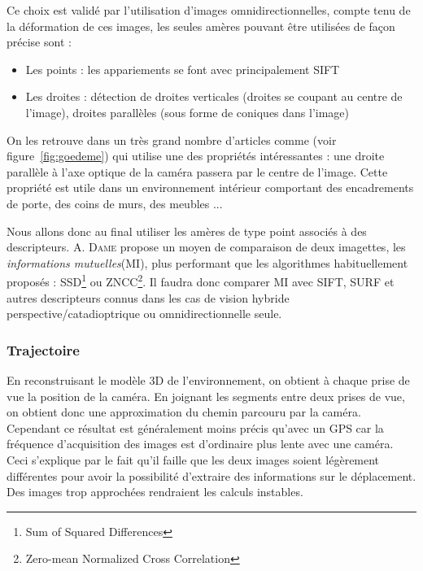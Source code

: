Ce choix est validé par l'utilisation d'images omnidirectionnelles, compte tenu de la déformation de ces images, les seules amères pouvant être utilisées de façon précise sont :
\begin{itemize}
\item Les points : les appariements se font avec principalement SIFT
\item Les droites : détection de droites verticales (droites se coupant au centre de l'image), droites parallèles (sous forme de coniques dans l'image)
\end{itemize}
On les retrouve dans un très grand nombre d'articles comme \cite{Goedeme07} (voir figure~\ref{fig:goedeme}) qui utilise une des propriétés intéressantes : une droite parallèle à l'axe optique de la caméra passera par le centre de l'image.
Cette propriété est utile dans un environnement intérieur comportant des encadrements de porte, des coins de murs, des meubles ...

Nous allons donc au final utiliser les amères de type point associés à des descripteurs.
A. \textsc{Dame} \cite{Dame10PhD} propose un moyen de comparaison de deux imagettes, les \emph{informations mutuelles}(MI), plus performant que les algorithmes habituellement proposés : SSD\footnote{Sum of Squared Differences} ou ZNCC\footnote{Zero-mean Normalized Cross Correlation}.
Il faudra donc comparer MI avec SIFT, SURF et autres descripteurs connus dans les cas de vision hybride perspective/catadioptrique ou omnidirectionnelle seule.  

\subsubsection{Trajectoire}

En reconstruisant le modèle 3D de l'environnement, on obtient à chaque prise de vue la position de la caméra.
En joignant les segments entre deux prises de vue, on obtient donc une approximation du chemin parcouru par la caméra.
Cependant ce résultat est généralement moins précis qu'avec un GPS car la fréquence d'acquisition des images est d'ordinaire plus lente avec une caméra.
Ceci s'explique par le fait qu'il faille que les deux images soient légèrement différentes pour avoir la possibilité d'extraire des informations sur le déplacement.
Des images trop approchées rendraient les calculs instables.

